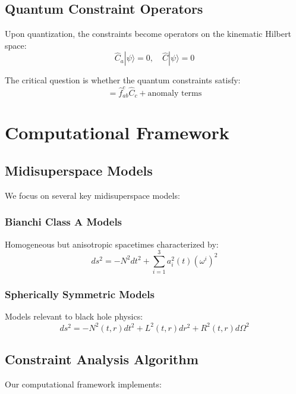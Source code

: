 \documentclass[11pt]{article}
\begin{document}
\subsection{Quantum Constraint Operators}

Upon quantization, the constraints become operators on the kinematic Hilbert space:
\begin{equation}
\hat{C}_a|\psi\rangle = 0, \quad \hat{C}|\psi\rangle = 0
\end{equation}

The critical question is whether the quantum constraints satisfy:
\begin{equation}
[\hat{C}_a, \hat{C}_b] = \hat{f}_{ab}^c \hat{C}_c + \text{anomaly terms}
\end{equation}

\section{Computational Framework}

\subsection{Midisuperspace Models}

We focus on several key midisuperspace models:

\subsubsection{Bianchi Class A Models}
Homogeneous but anisotropic spacetimes characterized by:
\begin{equation}
ds^2 = -N^2 dt^2 + \sum_{i=1}^3 a_i^2(t) (\omega^i)^2
\end{equation}

\subsubsection{Spherically Symmetric Models}
Models relevant to black hole physics:
\begin{equation}
ds^2 = -N^2(t,r) dt^2 + L^2(t,r) dr^2 + R^2(t,r) d\Omega^2
\end{equation}

\subsection{Constraint Analysis Algorithm}

Our computational framework implements:
\end{document}
